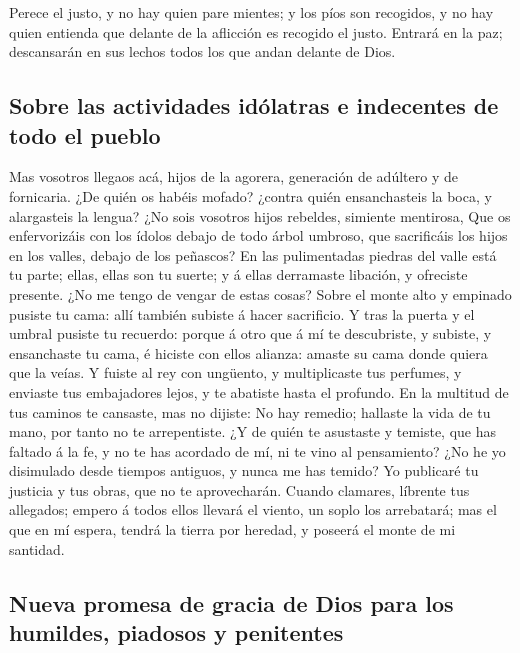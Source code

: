  Perece el justo, y no hay quien pare mientes; y los píos
son recogidos, y no hay quien entienda que delante de la aflicción es
recogido el justo.  Entrará en la paz; descansarán en sus
lechos todos los que andan delante de Dios.

\hypertarget{sobre-las-actividades-iduxf3latras-e-indecentes-de-todo-el-pueblo}{%
\subsection{Sobre las actividades idólatras e indecentes de todo el
pueblo}\label{sobre-las-actividades-iduxf3latras-e-indecentes-de-todo-el-pueblo}}

 Mas vosotros llegaos acá, hijos de la agorera, generación
de adúltero y de fornicaria.  ¿De quién os habéis mofado?
¿contra quién ensanchasteis la boca, y alargasteis la lengua? ¿No sois
vosotros hijos rebeldes, simiente mentirosa,  Que os
enfervorizáis con los ídolos debajo de todo árbol umbroso, que
sacrificáis los hijos en los valles, debajo de los peñascos?
 En las pulimentadas piedras del valle está tu parte; ellas,
ellas son tu suerte; y á ellas derramaste libación, y ofreciste
presente. ¿No me tengo de vengar de estas cosas?  Sobre el
monte alto y empinado pusiste tu cama: allí también subiste á hacer
sacrificio.  Y tras la puerta y el umbral pusiste tu
recuerdo: porque á otro que á mí te descubriste, y subiste, y
ensanchaste tu cama, é hiciste con ellos alianza: amaste su cama donde
quiera que la veías.  Y fuiste al rey con ungüento, y
multiplicaste tus perfumes, y enviaste tus embajadores lejos, y te
abatiste hasta el profundo.  En la multitud de tus caminos
te cansaste, mas no dijiste: No hay remedio; hallaste la vida de tu
mano, por tanto no te arrepentiste.  ¿Y de quién te
asustaste y temiste, que has faltado á la fe, y no te has acordado de
mí, ni te vino al pensamiento? ¿No he yo disimulado desde tiempos
antiguos, y nunca me has temido?  Yo publicaré tu justicia
y tus obras, que no te aprovecharán.  Cuando clamares,
líbrente tus allegados; empero á todos ellos llevará el viento, un soplo
los arrebatará; mas el que en mí espera, tendrá la tierra por heredad, y
poseerá el monte de mi santidad.

\hypertarget{nueva-promesa-de-gracia-de-dios-para-los-humildes-piadosos-y-penitentes}{%
\subsection{Nueva promesa de gracia de Dios para los humildes, piadosos
y
penitentes}\label{nueva-promesa-de-gracia-de-dios-para-los-humildes-piadosos-y-penitentes}}

